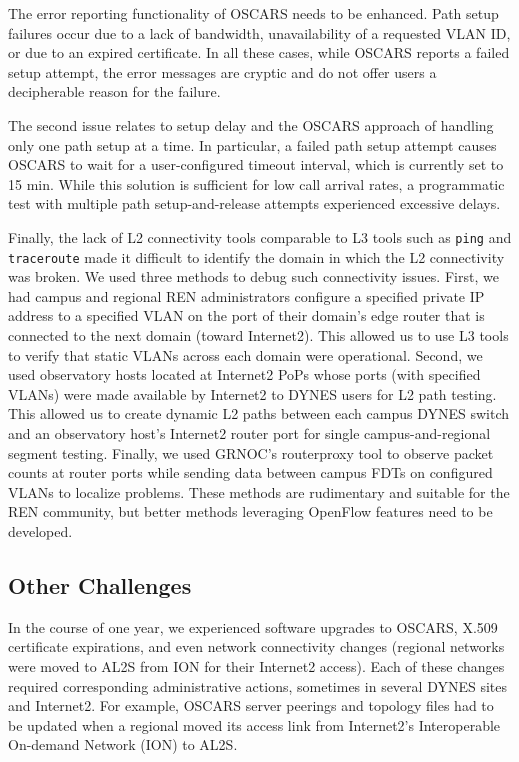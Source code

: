 The error reporting functionality of OSCARS needs to be enhanced. Path setup failures
occur due to a lack of bandwidth, unavailability of a requested VLAN ID, or due to an expired certificate. In all these cases, while OSCARS reports a failed setup attempt,
the error messages are cryptic and do not offer users a decipherable reason for the failure.

The second issue relates to setup delay and the OSCARS approach of handling only one path setup at a time.
In particular, a failed path setup attempt causes OSCARS to wait for a user-configured timeout interval, which is currently set to 15 min. While this solution is sufficient for low call arrival rates, a programmatic test with multiple path setup-and-release attempts experienced excessive delays.

Finally, the lack of L2 connectivity tools comparable to L3 tools such as \texttt{ping} and \texttt{traceroute} made it difficult to identify the domain in which the L2 connectivity
was broken.
We used three methods to debug such connectivity issues. First, we had campus and regional REN administrators configure a specified private IP address to a specified VLAN on the port of their domain's edge router that is connected to the next domain (toward Internet2). This allowed us to use L3 tools
to verify that static VLANs across each domain were operational. Second, we used observatory hosts located at Internet2 PoPs whose ports (with specified VLANs) were made available by Internet2 to DYNES users for L2 path testing. This allowed us to create dynamic L2 paths between each campus DYNES switch and an observatory host's Internet2 router port for single campus-and-regional segment testing. Finally, we used GRNOC's routerproxy tool \cite{routerproxy} to observe packet counts at router ports while sending data between campus FDTs on configured VLANs to localize problems. These methods are rudimentary and suitable for the REN community,
but better methods leveraging OpenFlow features need to be developed.

\subsection{Other Challenges}
\label{sec:other-challenges}
In the course of one year, we experienced software upgrades to OSCARS,
X.509 certificate expirations, and even network connectivity changes (regional networks
were moved to AL2S from ION for their Internet2 access). Each of
these changes required corresponding administrative actions, sometimes in several
DYNES sites and Internet2. For example, OSCARS server peerings and topology
files had to be updated
when a regional moved its access link from Internet2's Interoperable On-demand Network (ION) to AL2S.
